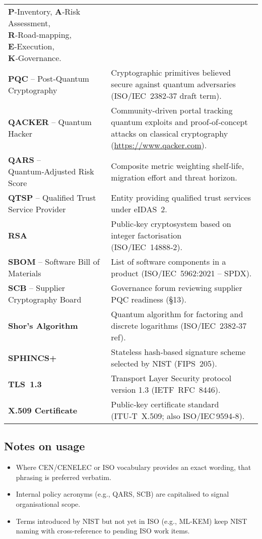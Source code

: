 \documentclass[
  english,
]{article}
\providecommand{\tightlist}{%
  \setlength{\itemsep}{0pt}\setlength{\parskip}{0pt}}
\begin{document}
\begin{longtable}[]{@{}
  >{\raggedright\arraybackslash}p{}
  >{\raggedright\arraybackslash}p{}@{}}
\textbf{P}‑Inventory, \textbf{A}‑Risk Assessment,
\textbf{R}‑Road‑mapping, \textbf{E}‑Execution, \textbf{K}‑Governance. \\
\textbf{PQC} -- Post‑Quantum Cryptography & Cryptographic primitives
believed secure against quantum adversaries (ISO/IEC~2382‑37 draft
term). \\
\textbf{QACKER} -- Quantum Hacker & Community-driven portal tracking
quantum exploits and proof‑of‑concept attacks on classical cryptography
(\url{https://www.qacker.com}). \\
\textbf{QARS} -- Quantum‑Adjusted Risk Score & Composite metric
weighting shelf‑life, migration effort and threat horizon. \\
\textbf{QTSP} -- Qualified Trust Service Provider & Entity providing
qualified trust services under eIDAS~2. \\
\textbf{RSA} & Public‑key cryptosystem based on integer factorisation
(ISO/IEC~14888‑2). \\
\textbf{SBOM} -- Software Bill of Materials & List of software
components in a product (ISO/IEC~5962:2021 -- SPDX). \\
\textbf{SCB} -- Supplier Cryptography Board & Governance forum reviewing
supplier PQC readiness (§13). \\
\textbf{Shor's Algorithm} & Quantum algorithm for factoring and discrete
logarithms (ISO/IEC~2382‑37 ref). \\
\textbf{SPHINCS+} & Stateless hash‑based signature scheme selected by
NIST (FIPS~205). \\
\textbf{TLS~1.3} & Transport Layer Security protocol version 1.3
(IETF~RFC~8446). \\
\textbf{X.509 Certificate} & Public‑key certificate standard
(ITU‑T~X.509; also ISO/IEC\,9594‑8). \\
\end{longtable}

\subsection{Notes on usage}\label{notes-on-usage}

\begin{itemize}
\tightlist
\item
  Where CEN/CENELEC or ISO vocabulary provides an exact wording, that
  phrasing is preferred verbatim.
\item
  Internal policy acronyms (e.g., QARS, SCB) are capitalised to signal
  organisational scope.
\item
  Terms introduced by NIST but not yet in ISO (e.g., ML‑KEM) keep NIST
  naming with cross‑reference to pending ISO work items.
\end{itemize}
\end{document}
